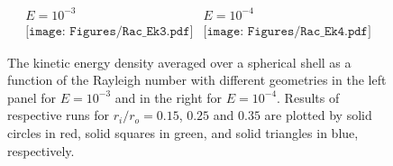 \begin{figure}
\begin{center}
\[
\begin{array}{cc}
\mbox{$E = 10^{-3}$} & \mbox{$E = 10^{-4}$} \\
\texttt{[image: Figures/Rac\_Ek3.pdf]} &
\texttt{[image: Figures/Rac\_Ek4.pdf]}
\end{array}
\]
\end{center}
\caption{%
The kinetic energy density averaged over a spherical shell as a function of the Rayleigh number with different geometries in the left panel for $E = 10^{-3}$ and in the right for $E = 10^{-4}$. 
Results of respective runs for $r_i/r_o = 0.15$, $0.25$ and $0.35$ are plotted by solid circles in red, solid squares in green, and solid triangles in blue, respectively. 
}
\label{fig:fig_1}
\end{figure}